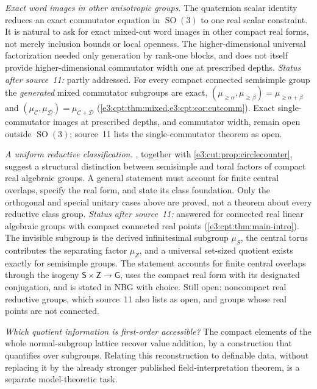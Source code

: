 \documentclass[11pt,letterpaper]{article}
\numberwithin{equation}{section}
\theoremstyle{definition}
\theoremstyle{remark}
\newcommand{\SO}{\operatorname{SO}}
\newcommand{\comm}[2]{\left(#1,#2\right)}
\newcommand{\sG}{\mathsf G}
\newcommand{\sS}{\mathsf S}
\newcommand{\sZ}{\mathsf Z}
\begin{document}
\emph{Exact word images in other anisotropic groups.} The quaternion scalar
identity reduces an exact commutator equation in $\SO(3)$ to one real scalar
constraint. It is natural to ask for exact mixed-cut word images in other
compact real forms, not merely inclusion bounds or local openness. The
higher-dimensional universal factorization needed only generation by rank-one
blocks, and does not itself provide higher-dimensional commutator width one at
prescribed depths. \emph{Status after source~11:} partly addressed. For every
compact connected semisimple group the \emph{generated} mixed commutator
subgroups are exact, $\comm{\mu_{\ge\alpha}}{\mu_{\ge\beta}}=\mu_{\ge\alpha+\beta}$
and $\comm{\mu_{\mathcal C}}{\mu_{\mathcal D}}=\mu_{\mathcal C+\mathcal D}$
(\cref{e3:cpt:thm:mixed,e3:cpt:cor:cutcomm}). Exact single-commutator images at
prescribed depths, and commutator width, remain open outside $\SO(3)$; source~11
lists the single-commutator theorem as open.

\emph{A uniform reductive classification.}
, together with
\cref{e3:cut:prop:circlecounter}, suggest a structural distinction between
semisimple and toral factors of compact real algebraic groups. A general
statement must account for finite central overlaps, specify the real form, and
state its class foundation. Only the orthogonal and special unitary cases above
are proved, not a theorem about every reductive class group.
\emph{Status after source~11:} answered for connected real linear algebraic
groups with compact connected real points (\cref{e3:cpt:thm:main-intro}). The
invisible subgroup is the derived infinitesimal subgroup $\mu_S$, the central
torus contributes the separating factor $\mu_Z$, and a universal set-sized
quotient exists exactly for semisimple groups. The statement accounts for finite
central overlaps through the isogeny $\sS\times\sZ\to\sG$, uses the compact real
form with its designated conjugation, and is stated in NBG with choice. Still
open: noncompact real reductive groups, which source~11 also lists as open, and
groups whose real points are not connected.

\emph{Which quotient information is first-order accessible?} The compact
elements of the whole normal-subgroup lattice recover value addition, by a
construction that quantifies over subgroups. Relating this reconstruction to
definable data, without replacing it by the already stronger published
field-interpretation theorem, is a separate model-theoretic task.
\end{document}
